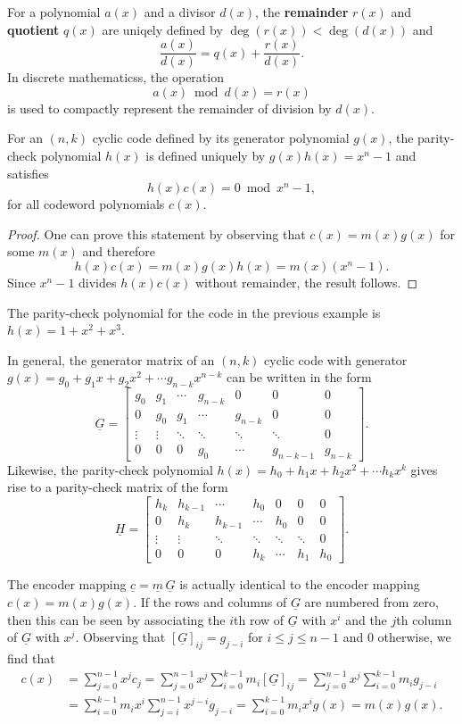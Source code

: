 For a polynomial $a(x)$ and a divisor $d(x)$, the \textbf{remainder} $r(x)$ and \textbf{quotient} $q(x)$  are uniqely defined by $\deg\left( r(x) \right) < \deg \left(d(x) \right)$ and
\[ \frac{a(x)}{d(x)} = q(x) + \frac{r(x)}{d(x)}. \]
In discrete mathematicss, the  operation
\[ a(x) \bmod d(x) = r(x) \]
is used to compactly represent the remainder of division by $d(x)$.
\begin{proposition}
For an $(n,k)$ cyclic code defined by its generator polynomial $g(x)$, the parity-check polynomial $h(x)$ is defined uniquely by $g(x)h(x)=x^n - 1$ and satisfies
\[ h(x)c(x) = 0 \bmod x^n - 1, \]
for all codeword polynomials $c(x)$.
\end{proposition}
\begin{proof}
One can prove this statement by observing that $c(x)=m(x)g(x)$ for some $m(x)$ and therefore
\[ h(x)c(x) = m(x)g(x)h(x) = m(x)(x^n - 1). \]
Since $x^n -1$ divides $h(x)c(x)$ without remainder, the result follows.
\end{proof}
The parity-check polynomial for the code in the previous example is $h(x) = 1 + x^2 + x^3$.

In general, the generator matrix of an $(n,k)$ cyclic code with generator $g(x)=g_0 + g_1 x + g_2 x^2 + \cdots g_{n-k} x^{n-k}$ can be written in the form
\[ \underline{G} = \left[ \begin{array}{ccccccc}
g_0 & g_1 & \cdots & g_{n-k} & 0 & 0 & 0 \\
0 & g_0 & g_1 & \cdots & g_{n-k} & 0 & 0 \\
\vdots & \vdots & \ddots & \ddots & \ddots & \ddots & 0 \\
0 & 0 & 0 & g_0 & \cdots & g_{n-k-1} & g_{n-k} \end{array} \right]. \]
Likewise, the parity-check polynomial $h(x) = h_0 + h_1 x + h_2 x^2 + \cdots h_{k} x^k$ gives rise to a parity-check matrix of the form
\[ \underline{H} = \left[ \begin{array}{ccccccc}
h_k & h_{k-1} & \cdots & h_0 & 0 & 0 & 0 \\
0 & h_k & h_{k-1} & \cdots & h_0 & 0 & 0 \\
\vdots & \vdots & \ddots & \ddots & \ddots & \ddots & 0 \\
0 & 0 & 0 & h_k & \cdots & h_1 & h_0 \end{array} \right]. \]

The encoder mapping $\underline{c} = \underline{m} \, \underline{G}$ is actually identical to the encoder mapping $c(x) = m(x) g(x)$.
If the rows and columns of $\underline{G}$ are numbered from zero, then this can be seen by associating the $i$th row of $\underline{G}$ with $x^i$ and the $j$th column of $\underline{G}$ with $x^j$.
Observing that $[\underline{G}]_{ij} = g_{j-i}$ for $i \leq j \leq n-1$ and 0 otherwise, we find that
\begin{align*}
c(x)
&= \sum_{j=0}^{n-1} x^j c_j 
= \sum_{j=0}^{n-1} x^j \sum_{i=0}^{k-1} m_i [\underline{G}]_{ij} 
= \sum_{j=0}^{n-1} x^j \sum_{i=0}^{k-1} m_i g_{j-i} \\
&= \sum_{i=0}^{k-1} m_i x^i \sum_{j=i}^{n-1} x^{j-i} g_{j-i} 
= \sum_{i=0}^{k-1} m_i x^i g(x) 
= m(x) g(x).
\end{align*}


